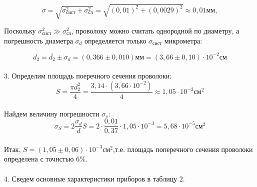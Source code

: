 \documentclass[14pt, a4paper]{scrartcl}
\begin{document}
\begin{equation}\label{eq:sigmasist}
\sigma=\sqrt{\sigma_\text{сист}^2+\sigma_\text{сл}^2}=\sqrt{(0,01)^2+(0,0029)^2}\approx0,01 \text{мм}, 
\end{equation}

Поскольку $\sigma_\text{сист}^2\gg\sigma_\text{сл}^2$, проволоку можно считать однородной по диаметру, а погрешность диаметра $\sigma_ d$ определяется только $\sigma_\text{сист}$ микрометра:

\begin{equation}\label{eq:d2powtor}
d_2=\overline{d_2}\pm\sigma_d=(0,366\pm0,010)\text{мм}=(3,66\pm0,10)\cdot10^{-2} \text{см}
\end{equation}


\paragraph{}
3. Определим площадь поеречного сечения проволоки:
\begin{equation}\label{eq:Splochad}
S=\frac{\pi d_2^2}{4} = \frac{3,14\cdot(3,66\cdot10^{-2})}{4}\approx1,05\cdot10^{-3} \text{см}^2
\end{equation}
\paragraph{}
Найдем величину погрешности $\sigma_s$:
\begin{equation}\label{eq:Splochad2}
\sigma_S=2\frac{\sigma_d}{d}S = 2\cdot\frac{0,01}{0,37}\cdot1,05\cdot10^{-3}=5,68\cdot10^{-5}\text{см}^2
\end{equation}
\paragraph{}
Итак, $S=(1,05\pm0,06)\cdot10^{-3}\text{см}^2$,т.е. площадь поперечного сечения проволоки определена с точнстью 6\%.

\paragraph{}
4. Сведем основные характеристики приборов в таблицу 2.
\end{document}
